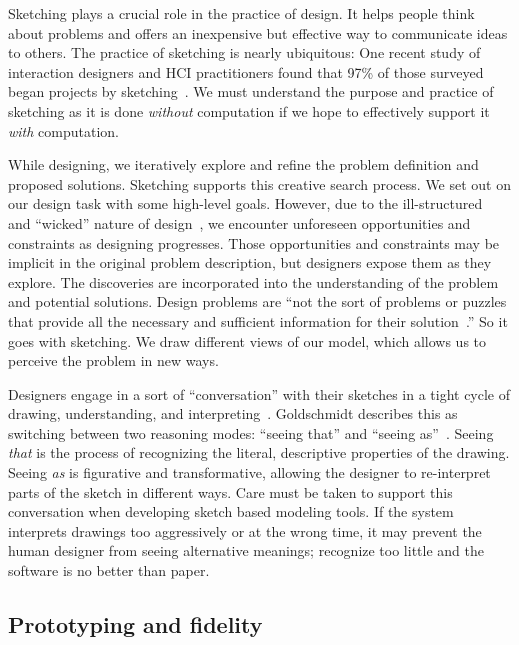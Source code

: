 Sketching plays a crucial role in the practice of design. It helps
people think about problems and offers an inexpensive but effective
way to communicate ideas to others. The practice of sketching is
nearly ubiquitous: One recent study of interaction designers and HCI
practitioners found that 97\% of those surveyed began projects by
sketching~\cite{myers-behavior-design}. We must understand the purpose
and practice of sketching as it is done \textit{without} computation
if we hope to effectively support it \textit{with} computation.



While designing, we iteratively explore and refine the problem
definition and proposed solutions. Sketching supports this creative
search process. We set out on our design task with some high-level
goals. However, due to the
ill-structured~\cite{simon-ill-structured-problems} and ``wicked''
nature of design~\cite{rittel-wicked}, we encounter unforeseen
opportunities and constraints as designing progresses. Those
opportunities and constraints may be implicit in the original problem
description, but designers expose them as they explore. The
discoveries are incorporated into the understanding of the problem and
potential solutions. Design problems are ``not the sort of problems or
puzzles that provide all the necessary and sufficient information for
their solution~\cite{cross-nature-nurture}.'' So it goes with
sketching. We draw different views of our model, which allows us to
perceive the problem in new ways.

Designers engage in a sort of ``conversation'' with their sketches in
a tight cycle of drawing, understanding, and
interpreting~\cite{schon-kinds-of-seeing}. Goldschmidt describes this
as switching between two reasoning modes: ``seeing that'' and ``seeing
as''~\cite{goldschmidt-dialectics}. Seeing \textit{that} is the
process of recognizing the literal, descriptive properties of the
drawing.  Seeing \textit{as} is figurative and transformative,
allowing the designer to re-interpret parts of the sketch in different
ways. Care must be taken to support this conversation when developing
sketch based modeling tools. If the system interprets drawings too
aggressively or at the wrong time, it may prevent the human designer
from seeing alternative meanings; recognize too little and the
software is no better than paper.

\subsection{Prototyping and fidelity}
\label{sec:traditional-prototyping}

